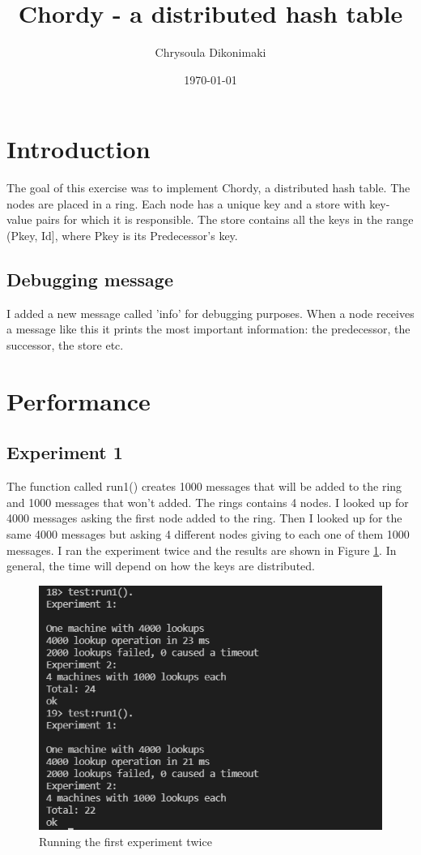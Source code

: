 \documentclass[a4paper, 11pt]{article}
\title{Chordy - a distributed hash table}
\author{Chrysoula Dikonimaki}
\date{\today{}}
\begin{document}
\maketitle

\section{Introduction}
The goal of this exercise was to implement Chordy, a distributed hash table. The nodes are placed in a ring. Each node has a unique key and a store with  key-value pairs for which it is responsible. The store contains all the keys in the range (Pkey, Id], where Pkey is its Predecessor's key.

\subsection{Debugging message}
I added a new message called 'info' for debugging purposes. When a node receives a message like this it prints the most important information: the predecessor, the successor, the store etc.

\section{Performance}
\subsection{Experiment 1}
The function called run1() creates 1000 messages that will be added to the ring and 1000 messages that won't added. The rings contains 4 nodes. I looked up for 4000 messages asking the first node added to the ring. Then I looked up for the same 4000 messages but asking 4 different nodes giving to each one of them 1000 messages. I ran the experiment twice and the results are shown in Figure \ref{exp1}. In general, the time will depend on how the keys are distributed.

\begin{figure}
  \begin{center}
    \includegraphics[scale=0.4]{exp1.PNG}
    \caption{Running the first experiment twice}
    \label{exp1}
  \end{center}
\end{figure}
\end{document}
